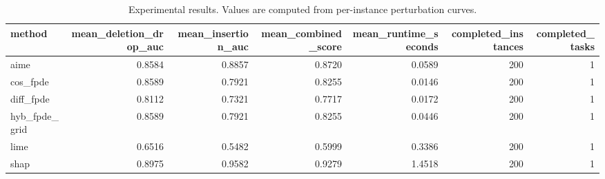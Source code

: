 \begin{table}[t]
\caption{Experimental results. Values are computed from per-instance perturbation curves.}
\label{tab:main_results_computed}
\centering
\begin{tabular}{lrrrrrr}
\toprule
method & mean\_deletion\_drop\_auc & mean\_insertion\_auc & mean\_combined\_score & mean\_runtime\_seconds & completed\_instances & completed\_tasks \\
\midrule
aime & 0.8584 & 0.8857 & 0.8720 & 0.0589 & 200 & 1 \\
cos\_fpde & 0.8589 & 0.7921 & 0.8255 & 0.0146 & 200 & 1 \\
diff\_fpde & 0.8112 & 0.7321 & 0.7717 & 0.0172 & 200 & 1 \\
hyb\_fpde\_grid & 0.8589 & 0.7921 & 0.8255 & 0.0446 & 200 & 1 \\
lime & 0.6516 & 0.5482 & 0.5999 & 0.3386 & 200 & 1 \\
shap & 0.8975 & 0.9582 & 0.9279 & 1.4518 & 200 & 1 \\
\bottomrule
\end{tabular}

\end{table}
